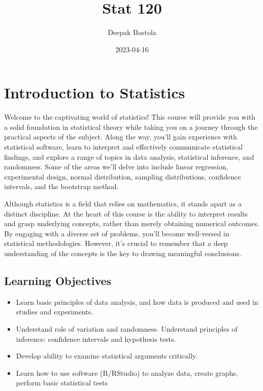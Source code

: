 \documentclass[
]{book}
\title{Stat 120}
\author{Deepak Bastola}
\date{2023-04-16}
\begin{document}
\maketitle

{
\setcounter{tocdepth}{1}
\tableofcontents
}
\hypertarget{introduction-to-statistics}{%
\chapter*{Introduction to Statistics}\label{introduction-to-statistics}}

Welcome to the captivating world of statistics! This course will provide you with a solid foundation in statistical theory while taking you on a journey through the practical aspects of the subject. Along the way, you'll gain experience with statistical software, learn to interpret and effectively communicate statistical findings, and explore a range of topics in data analysis, statistical inference, and randomness. Some of the areas we'll delve into include linear regression, experimental design, normal distribution, sampling distributions, confidence intervals, and the bootstrap method.

Although statistics is a field that relies on mathematics, it stands apart as a distinct discipline. At the heart of this course is the ability to interpret results and grasp underlying concepts, rather than merely obtaining numerical outcomes. By engaging with a diverse set of problems, you'll become well-versed in statistical methodologies. However, it's crucial to remember that a deep understanding of the concepts is the key to drawing meaningful conclusions.

\hypertarget{learning-objectives}{%
\section{Learning Objectives}\label{learning-objectives}}

\begin{itemize}
\item
  Learn basic principles of data analysis, and how data is produced and used in studies and experiments.
\item
  Understand role of variation and randomness. Understand principles of inference: confidence intervals and hypothesis tests.
\item
  Develop ability to examine statistical arguments critically.
\item
  Learn how to use software (R/RStudio) to analyze data, create graphs, perform basic statistical tests
\end{itemize}
\end{document}
